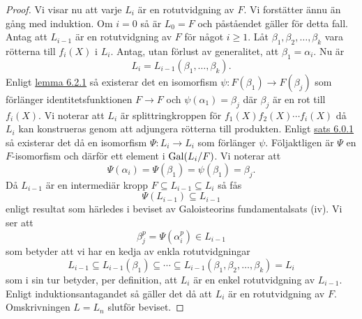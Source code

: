 \documentclass{article}
\newcommand{\gal}[0]{\textnormal{Gal}}
\theoremstyle{definition}
\begin{document}
\begin{proof}
  Vi visar nu att varje $L_i$ är en rotutvidgning av $F$. Vi forstätter ännu än gång med induktion. Om $i = 0$ så är $L_0 = F$
  och påståendet gäller för detta fall. Antag att $L_{i-1}$ är en rotutvidgning av $F$ för något $i \geq 1$. Låt $\beta_1, \beta_2, \ldots, \beta_k$
  vara rötterna till $f_i(X)$ i $L_i$. Antag, utan förlust av generalitet, att $\beta_1 = \alpha_i$. Nu är 
  \[L_i = L_{i-1}(\beta_1, \ldots, \beta_k).\]
  Enligt \hyperlink{6.0.2}{lemma 6.2.1} så existerar det en isomorfism $\psi: F(\beta_1) \rightarrow F(\beta_j)$ som förlänger 
  identitetsfunktionen $F \rightarrow F$ och $\psi(\alpha_1) = \beta_j$
  där $\beta_j$ är en rot till $f_i(X)$. Vi noterar att $L_i$ är splittringkroppen för $f_1(X)f_2(X) \cdots f_i(X)$
  då $L_i$ kan konstrueras genom att adjungera rötterna till produkten. Enligt \hyperlink{sats6.0.1}{sats 6.0.1} så existerar det då 
  en isomorfism $\Psi: L_i \rightarrow L_i$ som förlänger $\psi$. Följaktligen är $\Psi$ en $F$-isomorfism och därför ett element i $\gal(L_i/F)$.
  Vi noterar att 
  \[\Psi(\alpha_i) = \Psi(\beta_1) = \psi(\beta_1) = \beta_j.\]
  Då $L_{i-1}$ är en intermediär kropp $F \subseteq L_{i-1} \subseteq L_i$ så fås 
  \[\Psi(L_{i-1}) \subseteq L_{i-1}\]
  enligt resultat som härledes i beviset av Galoisteorins fundamentalsats (iv). Vi ser att 
  \[\beta_j^p = \Psi(\alpha_i^p) \in L_{i-1}\]
  som betyder att vi har en kedja av enkla rotutvidgningar 
  \[L_{i-1} \subseteq L_{i-1} (\beta_1) \subseteq \cdots \subseteq L_{i-1}(\beta_1, \beta_2, \ldots, \beta_k) = L_i\]
  som i sin tur betyder, per definition, att $L_{i}$ är en enkel rotutvidgning av $L_{i-1}$. Enligt induktionsantagandet så 
  gäller det då att $L_i$ är en rotutvidgning av $F$. Omskrivningen $L = L_n$ slutför beviset. 
\end{proof}
\end{document}
